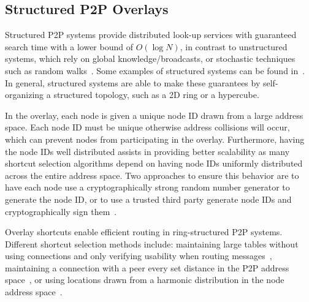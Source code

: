 \documentclass[letterpaper,twocolumn,10pt]{article}
\begin{document}
\subsection{Structured P2P Overlays}
Structured P2P systems provide distributed look-up services with guaranteed
search time with a lower bound of $O(\log N)$, in contrast to unstructured
systems, which rely on global knowledge/broadcasts, or stochastic techniques
such as random walks~\cite{unstructured_v_structured}.  Some examples of
structured systems can be found in~\cite{pastry, chord, symphony, kademlia,
can, dynamo}.  In general, structured systems are able to make these guarantees by
self-organizing a structured topology, such as a 2D ring or a hypercube.

In the overlay, each node is given a unique node ID drawn from a large address
space.  Each node ID must be unique otherwise address collisions will occur,
which can prevent nodes from participating in the overlay.  Furthermore, having
the node IDs well distributed assists in providing better scalability as many
shortcut selection algorithms depend on having node IDs uniformly distributed
across the entire address space.  Two approaches to ensure this behavior are
to have each node use a cryptographically strong random number generator to
generate the node ID, or to use a trusted third party generate node IDs and
cryptographically sign them~\cite{secure_routing}.

%

Overlay shortcuts enable efficient routing in ring-structured P2P systems.
Different shortcut selection methods include: maintaining large tables without
using connections and only verifying usability when routing
messages~\cite{pastry, kademlia}, maintaining a connection with a peer every
set distance in the P2P address space~\cite{chord}, or using locations drawn
from a harmonic distribution in the node address space~\cite{symphony}.
\end{document}
